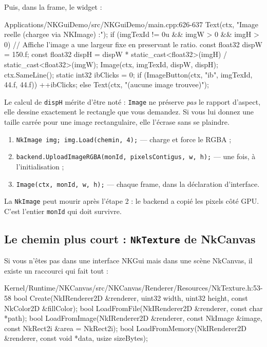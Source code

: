 Puis, dans la frame, le widget :

\begin{nkcode}{Applications/NKGuiDemo/src/NKGuiDemo/main.cpp:626-637}
            Text(ctx, "Image reelle (chargee via NKImage) :");
            if (imgTexId != 0u && imgW > 0 && imgH > 0) {
                // Affiche l'image a une largeur fixe en preservant le ratio.
                const float32 dispW = 150.f;
                const float32 dispH = dispW * static_cast<float32>(imgH) / static_cast<float32>(imgW);
                Image(ctx, imgTexId, dispW, dispH);
                ctx.SameLine();
                static int32 ibClicks = 0;
                if (ImageButton(ctx, "ib", imgTexId, 44.f, 44.f))
                    ++ibClicks;
            } else {
                Text(ctx, "(aucune image trouvee)");
            }
\end{nkcode}

Le calcul de \texttt{dispH} mérite d'être noté : \texttt{Image} ne préserve
\emph{pas} le rapport d'aspect, elle dessine exactement le rectangle que vous
demandez. Si vous lui donnez une taille carrée pour une image rectangulaire,
elle l'écrase sans se plaindre.

\begin{nkretenir}
\begin{enumerate}
  \item \texttt{NkImage img; img.Load(chemin, 4);} — charge et force le RGBA ;
  \item \texttt{backend.UploadImageRGBA(monId, pixelsContigus, w, h);} — une
        fois, à l'initialisation ;
  \item \texttt{Image(ctx, monId, w, h);} — chaque frame, dans la déclaration
        d'interface.
\end{enumerate}
La \texttt{NkImage} peut mourir après l'étape 2 : le backend a copié les pixels
côté GPU. C'est l'entier \texttt{monId} qui doit survivre.
\end{nkretenir}

\subsection{Le chemin plus court : \texttt{NkTexture} de NkCanvas}

Si vous n'êtes pas dans une interface NKGui mais dans une scène NkCanvas, il
existe un raccourci qui fait tout :

\begin{nkcode}{Kernel/Runtime/NKCanvas/src/NKCanvas/Renderer/Resources/NkTexture.h:53-58}
bool Create(NkIRenderer2D &renderer, uint32 width, uint32 height, const NkColor2D &fillColor);
bool LoadFromFile(NkIRenderer2D &renderer, const char *path);
bool LoadFromImage(NkIRenderer2D &renderer, const NkImage &image, const NkRect2i &area = NkRect2i{});
bool LoadFromMemory(NkIRenderer2D &renderer, const void *data, usize sizeBytes);
\end{nkcode}

